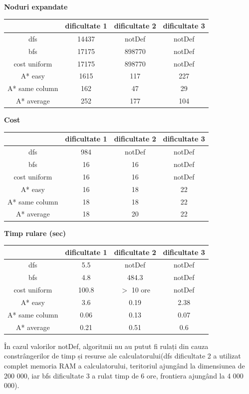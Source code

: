 \documentclass{article}
\begin{document}
\textbf{Noduri expandate}
\begin{center}
\begin{tabular}{||c c c c||} 
 \hline
  & dificultate 1 & dificultate 2 & dificultate 3 \\ [0.5ex] 
 \hline\hline
 dfs & 14437 & notDef & notDef \\ 
 \hline
 bfs & 17175 & 898770 & notDef \\
 \hline
 cost uniform & 17175 & 898770 & notDef \\
 \hline
 A* easy & 1615 & 117 & 227 \\
 \hline
 A* same column & 162 & 47 & 29 \\ 
  \hline
 A* average & 252 & 177 & 104 \\ [1ex] 
 \hline
\end{tabular}
\end{center}

\hfill \break
\textbf{Cost}
\begin{center}
\begin{tabular}{||c c c c||} 
 \hline
  & dificultate 1 & dificultate 2 & dificultate 3 \\ [0.5ex] 
 \hline\hline
 dfs & 984 & notDef & notDef \\ 
 \hline
 bfs & 16 & 16 & notDef \\
 \hline
 cost uniform & 16 & 16 & notDef \\
 \hline
 A* easy & 16 & 18 & 22 \\
 \hline
 A* same column & 18 & 18 & 22 \\ 
  \hline
 A* average & 18 & 20 & 22 \\ [1ex] 
 \hline
\end{tabular}
\end{center}


\hfill \break
\textbf{Timp rulare (sec)}
\begin{center}
\begin{tabular}{||c c c c||} 
 \hline
  & dificultate 1 & dificultate 2 & dificultate 3 \\ [0.5ex] 
 \hline\hline
 dfs & 5.5 & notDef & notDef \\ 
 \hline
 bfs & 4.8 & 484.3 & notDef \\
 \hline
 cost uniform & 100.8 & $>$ 10 ore & notDef \\
 \hline
 A* easy & 3.6 & 0.19 & 2.38 \\
 \hline
 A* same column & 0.06 & 0.13 & 0.07 \\ 
  \hline
 A* average & 0.21 & 0.51 & 0.6 \\ [1ex] 
 \hline
\end{tabular}
\end{center}
În cazul valorilor notDef, algoritmii nu au putut fi rulați din cauza constrângerilor de timp și resurse ale calculatorului(dfs dificultate 2 a utilizat complet memoria RAM a calculatorului, teritoriul ajungând la dimensiunea de 200 000, iar bfs dificultate 3 a rulat timp de 6 ore, frontiera ajungând la 4 000 000).
\end{document}
